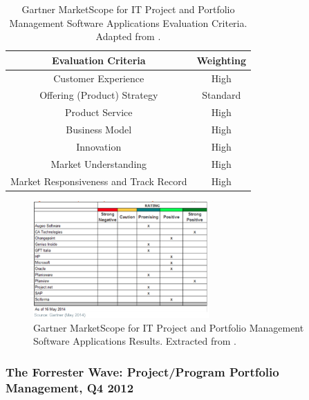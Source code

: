 \begin{table}[h!]
\centering
\begin{tabular}{|c|c|}
\hline
\textbf{Evaluation Criteria} & \textbf{Weighting} \\ \hline
Customer Experience & High \\ \hline
Offering (Product) Strategy & Standard \\ \hline
Product Service & High \\ \hline
Business Model & High \\ \hline
Innovation & High \\ \hline
Market Understanding & High \\ \hline
Market Responsiveness and Track Record & High \\ \hline
\end{tabular}
\vspace{2mm}
\caption{Gartner MarketScope for IT Project and Portfolio Management Software Applications Evaluation Criteria. Adapted from \cite{MarketScopePPM}.}
\label{my-label}
\end{table}

\begin{figure}[h!]
\centering
\includegraphics[width=0.6\textwidth]{img/MarketScopePPM.png}
\caption{Gartner MarketScope for IT Project and Portfolio Management Software Applications Results. Extracted from \cite{MarketScopePPM}.}
\end{figure}


\subsubsection{The Forrester Wave: Project/Program Portfolio Management, Q4 2012}

